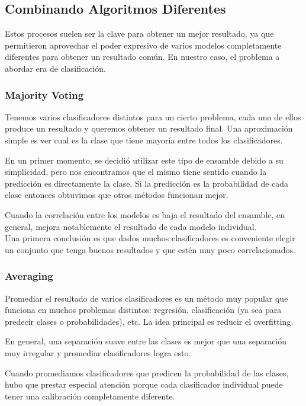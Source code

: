 \documentclass[a4paper ,12pt]{article}
\begin{document}
\subsection{Combinando Algoritmos Diferentes}

Estos procesos suelen ser la clave para obtener un mejor resultado, ya que permitieron aprovechar el poder expresivo
de varios modelos completamente diferentes para obtener un resultado común.
En nuestro caso, el problema a abordar era de clasificación.

\subsubsection{Majority Voting}

Tenemos varios clasificadores distintos para un cierto problema, cada uno de ellos produce un resultado y queremos obtener un 
 resultado final. Una aproximación simple es ver cual es la clase que tiene mayoría entre todos los clasificadores.

En un primer momento, se decidió utilizar este tipo de ensamble debido a su simplicidad, 
pero nos encontramos que el mismo tiene sentido cuando la predicción es directamente la clase.
Si la predicción es la probabilidad de cada clase entonces obtuvimos que otros métodos funcionan mejor. 

Cuando la correlación entre los modelos es baja el resultado del ensamble, en general, mejora notablemente el resultado de cada modelo individual. 
\\

Una primera conclusión es que dados muchos clasificadores es conveniente elegir un conjunto que tenga buenos resultados y que estén muy poco correlacionados.

\subsubsection{Averaging}

Promediar el resultado de varios clasificadores es un método muy popular que
funciona en muchos problemas distintos: regresión, clasificación (ya sea para
predecir clases o probabilidades), etc. La idea principal es reducir el overfitting.

En general, una separación suave entre las clases es mejor que una separación
muy irregular y promediar clasificadores logra esto.

Cuando promediamos clasificadores que predicen la probabilidad de las clases, hubo
que prestar especial atención porque cada clasificador individual puede tener una calibración completamente diferente. 
\end{document}
